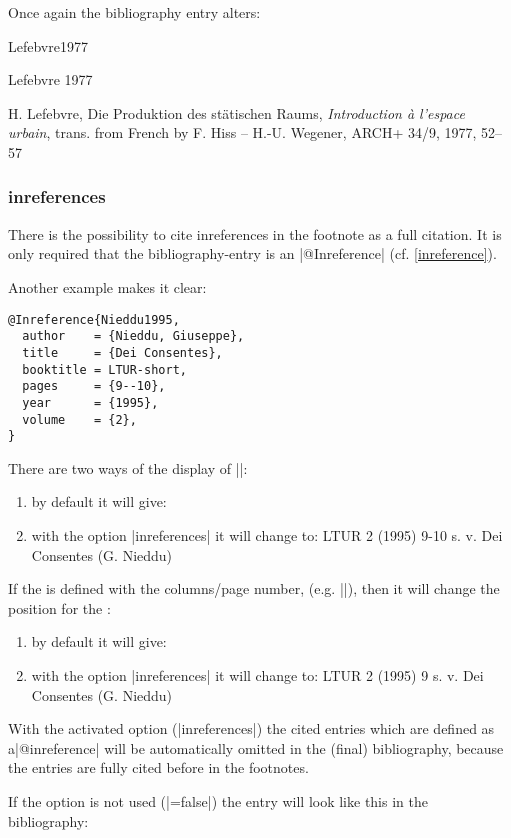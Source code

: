 \documentclass[a4paper,
10pt,
greek,
french,
spanish,
italian,
ngerman,
english
]{ltxdoc}
\begin{document}
Once again the bibliography entry alters:

\begin{bibbsp}{Lefebvre1977}%
\parbox[t]{2cm}{Lefebvre 1977} \parbox[t]{9cm}{H. Lefebvre, Die Produktion des stätischen Raums, \emph{Introduction à l’espace urbain}, {\color{red} trans. from French by F. Hiss -- H.-U. Wegener}, ARCH+ 34/9, 1977, 52–57}
\end{bibbsp}

\subsubsection{inreferences}\label{inreferences}
There is the possibility to cite inreferences in the footnote as a full citation.
It is only required that the bibliography-entry is an |@Inreference|  (cf. \cref{inreference}).
 
Another example makes it clear: 
\begin{lstlisting}[style=bibentry,label=Nieddu1995,caption={{@}Inreference\{Nieddu1995,…\} }]
@Inreference{Nieddu1995,
  author    = {Nieddu, Giuseppe},
  title     = {Dei Consentes},
  booktitle = LTUR-short,
  pages     = {9--10},
  year      = {1995},
  volume    = {2},
}
\end{lstlisting}
  \begin{refsection}
There are two ways of the display of |\cite{Nieddu1995}|:
 \begin{enumerate}
 \item by default it will give:  %
 \cite{Nieddu1995}
 \item with the option |inreferences| it will change to:
 LTUR 2 (1995) 9-10 s. v. Dei Consentes (G. Nieddu)
  \end{enumerate}

If the  is defined with the columns/page number, (e.g. |\cite[9]{Nieddu1995}|), 
then it will change the position for the :
\begin{enumerate} 
 \item by default it will give:  %
 \cite[9]{Nieddu1995}
 \item with the option |inreferences| it will change to:
  LTUR 2 (1995) 9 s. v. Dei Consentes (G. Nieddu)
  \end{enumerate}
With the activated option   (|inreferences|) the cited entries which are defined as a|@inreference| will be automatically omitted in the (final) bibliography,
because the entries are fully cited before in the footnotes.

If the option is not used (|=false|) the entry will look like this in the bibliography:
  \end{refsection}
\end{document}
